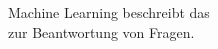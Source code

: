 \documentclass[preview]{standalone}
\begin{document}
\begin{center}
Machine Learning beschreibt das  \\ zur Beantwortung von Fragen.
\end{center}
\end{document}
